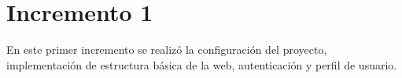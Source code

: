 \section{Incremento 1}
En este primer incremento se realizó la configuración del proyecto, implementación de estructura básica
de la web, autenticación y perfil de usuario.






